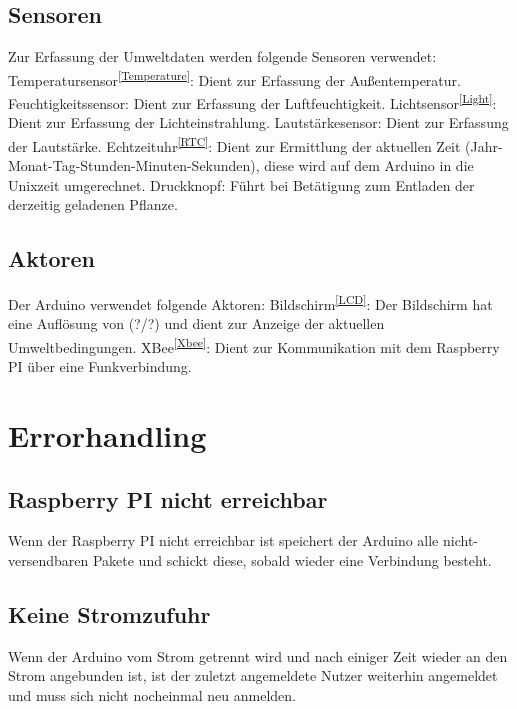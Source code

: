 \documentclass{article}
\begin{document}
\subsection{Sensoren}
Zur Erfassung der Umweltdaten werden folgende Sensoren verwendet: \newline
Temperatursensor\textsuperscript{\ref{Temperature}}: 
Dient zur Erfassung der Außentemperatur.\newline
Feuchtigkeitssensor: 
Dient zur Erfassung der Luftfeuchtigkeit.\newline
Lichtsensor\textsuperscript{\ref{Light}}: 
Dient zur Erfassung der Lichteinstrahlung.\newline
Lautstärkesensor: 
Dient zur Erfassung der Lautstärke. \newline
Echtzeituhr\textsuperscript{\ref{RTC}}: 
Dient zur Ermittlung der aktuellen Zeit (Jahr-Monat-Tag-Stunden-Minuten-Sekunden), 
diese wird auf dem Arduino in die Unixzeit umgerechnet.\newline
Druckknopf: 
Führt bei Betätigung zum Entladen der derzeitig geladenen Pflanze.\newline
\subsection{Aktoren}
Der Arduino verwendet folgende Aktoren: \newline
Bildschirm\textsuperscript{\ref{LCD}}: 
Der Bildschirm hat eine Auflösung von (?/?) und dient zur Anzeige der aktuellen Umweltbedingungen.\newline
XBee\textsuperscript{\ref{Xbee}}: 
Dient zur Kommunikation mit dem Raspberry PI über eine Funkverbindung.
\newpage

\section{Errorhandling}
\subsection{Raspberry PI nicht erreichbar}
Wenn der Raspberry PI nicht erreichbar ist speichert der Arduino alle nicht-versendbaren Pakete und schickt diese, sobald wieder eine Verbindung besteht.\newline
\subsection{Keine Stromzufuhr}
Wenn der Arduino vom Strom getrennt wird und nach einiger Zeit wieder an den Strom angebunden ist, ist der zuletzt angemeldete Nutzer weiterhin angemeldet und muss sich nicht nocheinmal neu anmelden.\newline
\newpage
\end{document}
